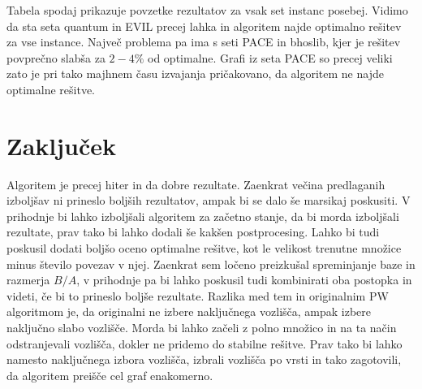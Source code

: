 \documentclass[slovenian, 10pt, titlepage, a4paper]{article}
\begin{document}
    

    Tabela spodaj prikazuje povzetke rezultatov za vsak set instanc posebej.
    Vidimo da sta seta quantum in EVIL precej lahka in algoritem najde optimalno rešitev za vse instance.
    Največ problema pa ima s seti PACE in bhoslib, kjer je rešitev povprečno slabša za $2-4\%$ od optimalne.
    Grafi iz seta PACE so precej veliki zato je pri tako majhnem času izvajanja pričakovano, da algoritem ne najde optimalne rešitve.

    

    \section{Zaključek}
    Algoritem je precej hiter in da dobre rezultate.
    Zaenkrat večina predlaganih izboljšav ni prineslo boljših rezultatov, ampak bi se dalo še marsikaj poskusiti.
    V prihodnje bi lahko izboljšali algoritem za začetno stanje, da bi morda izboljšali rezultate, prav tako bi lahko dodali še kakšen postprocesing.
    Lahko bi tudi poskusil dodati boljšo oceno optimalne rešitve, kot le velikost trenutne množice minus število povezav v njej.
    Zaenkrat sem ločeno preizkušal spreminjanje baze in razmerja $B/A$, v prihodnje pa bi lahko poskusil tudi kombinirati oba postopka in videti, če bi to prineslo boljše rezultate.
    Razlika med tem in originalnim PW algoritmom je, da originalni ne izbere naključnega vozlišča, ampak izbere naključno slabo vozlišče.
    Morda bi lahko začeli z polno množico in na ta način odstranjevali vozlišča, dokler ne pridemo do stabilne rešitve.
    Prav tako bi lahko namesto naključnega izbora vozlišča, izbrali vozlišča po vrsti in tako zagotovili, da algoritem preišče cel graf enakomerno.

    
\end{document}
